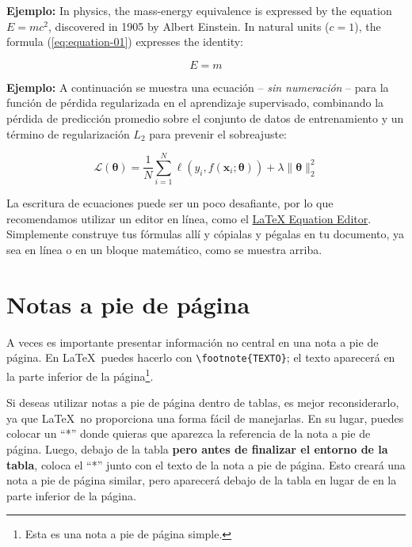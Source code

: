 \vspace{.875em}
\textbf{Ejemplo:} In physics, the mass-energy equivalence is expressed by the equation \(E=mc^2\), discovered in 1905 by Albert Einstein. In natural units ($c = 1$), the formula (\ref{eq:equation-01}) expresses the identity:

\begin{equation}
\label{eq:equation-01}
E=m
\end{equation}

\textbf{Ejemplo:} A continuación se muestra una ecuación -- \textit{sin numeración} -- para la función de pérdida regularizada en el aprendizaje supervisado, combinando la pérdida de predicción promedio sobre el conjunto de datos de entrenamiento y un término de regularización $L_2$ para prevenir el sobreajuste:

\[
\mathcal{L}(\boldsymbol{\theta}) = \frac{1}{N} \sum_{i=1}^{N} \ell(y_i, f(\mathbf{x}_i; \boldsymbol{\theta})) + \lambda \|\boldsymbol{\theta}\|_2^2
\]

La escritura de ecuaciones puede ser un poco desafiante, por lo que recomendamos utilizar un editor en línea, como el \href{https://latexeditor.lagrida.com/}{LaTeX Equation Editor}. Simplemente construye tus fórmulas allí y cópialas y pégalas en tu documento, ya sea en línea o en un bloque matemático, como se muestra arriba.

\section{Notas a pie de página}

A veces es importante presentar información no central en una nota a pie de página. En \LaTeX\ puedes hacerlo con \verb|\footnote{TEXTO}|; el texto aparecerá en la parte inferior de la página\footnote{Esta es una nota a pie de página simple.}.

Si deseas utilizar notas a pie de página dentro de tablas, es mejor reconsiderarlo, ya que \LaTeX\ no proporciona una forma fácil de manejarlas. En su lugar, puedes colocar un ``*'' donde quieras que aparezca la referencia de la nota a pie de página. Luego, debajo de la tabla \textbf{pero antes de finalizar el entorno de la tabla}, coloca el ``*'' junto con el texto de la nota a pie de página. Esto creará una nota a pie de página similar, pero aparecerá debajo de la tabla en lugar de en la parte inferior de la página.